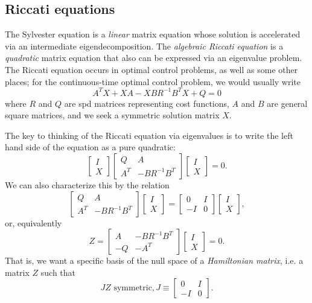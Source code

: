 \subsection{Riccati equations}

The Sylvester equation is a {\em linear} matrix equation whose solution
is accelerated via an intermediate eigendecomposition.  The
{\em algebraic Riccati equation} is a {\em quadratic} matrix equation
that also can be expressed via an eigenvalue problem.  The Riccati
equation occurs in optimal control problems, as well as some other places;
for the continuous-time optimal control problem, we would usually write
\[
  A^T X + XA - XBR^{-1} B^T X + Q = 0
\]
where $R$ and $Q$ are spd matrices representing cost functions,
$A$ and $B$ are general square matrices, and we seek a symmetric solution
matrix $X$.

The key to thinking of the Riccati equation via eigenvalues is to write
the left hand side of the equation as a pure quadratic:
\[
  \begin{bmatrix} I \\ X \end{bmatrix}
  \begin{bmatrix} Q & A \\ A^T & -BR^{-1}B^T \end{bmatrix}
  \begin{bmatrix} I \\ X \end{bmatrix} = 0.
\]
We can also characterize this by the relation
\[
  \begin{bmatrix} Q & A \\ A^T & -BR^{-1} B^T \end{bmatrix}
  \begin{bmatrix} I \\ X \end{bmatrix} =
  \begin{bmatrix} 0 & I \\ -I & 0 \end{bmatrix}
  \begin{bmatrix} I \\ X \end{bmatrix},
\]
or, equivalently
\[
  Z = \begin{bmatrix}
    A & -BR^{-1} B^T \\
    -Q & -A^T
  \end{bmatrix}
  \begin{bmatrix} I \\ X \end{bmatrix} = 0.
\]
That is, we want a specific basis of the null space of
a {\em Hamiltonian matrix}, i.e. a matrix $Z$ such that
\[
  JZ \mbox{ symmetric}, J \equiv \begin{bmatrix} 0 & I \\ -I & 0 \end{bmatrix}.
\]

